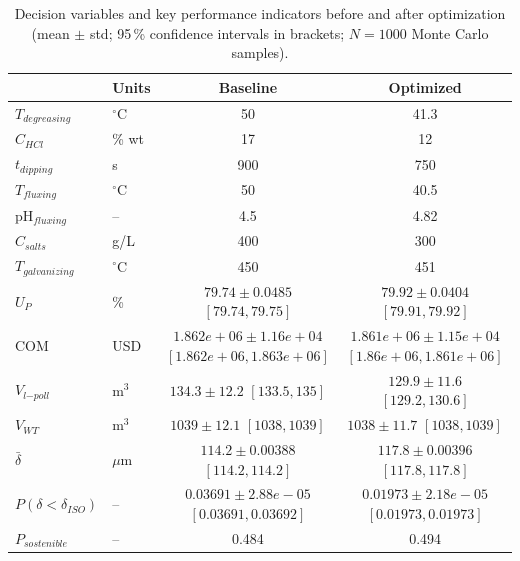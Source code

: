 \begin{table}[htbp]
\centering
\caption{Decision variables and key performance indicators before and after optimization (mean $\pm$ std; 95\,\% confidence intervals in brackets; $N = 1000$ Monte Carlo samples).}
\label{tab:summary}
\begin{tabular}{llcc}
\toprule
 & Units & Baseline & Optimized \\
\midrule
$T_{degreasing}$ & $^{\circ}$C & 50 & 41.3 \\
$C_{HCl}$ & \% wt & 17 & 12 \\
$t_{dipping}$ & s & 900 & 750 \\
$T_{fluxing}$ & $^{\circ}$C & 50 & 40.5 \\
pH$_{fluxing}$ & -- & 4.5 & 4.82 \\
$C_{salts}$ & g/L & 400 & 300 \\
$T_{galvanizing}$ & $^{\circ}$C & 450 & 451 \\
\midrule
$U_P$ & \% & $79.74 \pm 0.0485$ $[79.74, 79.75]$ & $79.92 \pm 0.0404$ $[79.91, 79.92]$ \\
COM & USD & $1.862e+06 \pm 1.16e+04$ $[1.862e+06, 1.863e+06]$ & $1.861e+06 \pm 1.15e+04$ $[1.86e+06, 1.861e+06]$ \\
$V_{l\mathrm{-}poll}$ & m$^3$ & $134.3 \pm 12.2$ $[133.5, 135]$ & $129.9 \pm 11.6$ $[129.2, 130.6]$ \\
$V_{WT}$ & m$^3$ & $1039 \pm 12.1$ $[1038, 1039]$ & $1038 \pm 11.7$ $[1038, 1039]$ \\
$\bar{\delta}$ & $\mu$m & $114.2 \pm 0.00388$ $[114.2, 114.2]$ & $117.8 \pm 0.00396$ $[117.8, 117.8]$ \\
$P(\delta < \delta_{ISO})$ & -- & $0.03691 \pm 2.88e-05$ $[0.03691, 0.03692]$ & $0.01973 \pm 2.18e-05$ $[0.01973, 0.01973]$ \\
\midrule
$P_{sostenible}$ & -- & 0.484 & 0.494 \\
\bottomrule
\end{tabular}
\end{table}
